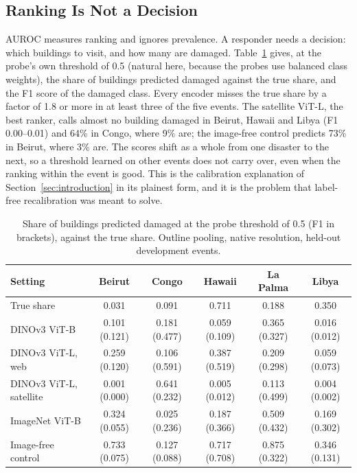 \documentclass[journal]{IEEEtran}
\begin{document}
\subsection{Ranking Is Not a Decision}
\label{sec:res-threshold}
AUROC measures ranking and ignores prevalence. A responder needs a decision: which buildings to visit, and how many are damaged. Table~\ref{tab:threshold} gives, at the probe's own threshold of 0.5 (natural here, because the probes use balanced class weights), the share of buildings predicted damaged against the true share, and the F1 score of the damaged class. Every encoder misses the true share by a factor of 1.8 or more in at least three of the five events. The satellite ViT-L, the best ranker, calls almost no building damaged in Beirut, Hawaii and Libya (F1 0.00--0.01) and 64\% in Congo, where 9\% are; the image-free control predicts 73\% in Beirut, where 3\% are. The scores shift as a whole from one disaster to the next, so a threshold learned on other events does not carry over, even when the ranking within the event is good. This is the calibration explanation of Section~\ref{sec:introduction} in its plainest form, and it is the problem that label-free recalibration was meant to solve.

\begin{table}[t]
\centering
\caption{Share of buildings predicted damaged at the probe threshold of 0.5 (F1 in brackets), against the true share. Outline pooling, native resolution, held-out development events.}
\label{tab:threshold}
\footnotesize
\begin{tabular}{@{}lccccc@{}}
\toprule
Setting & Beirut & Congo & Hawaii & La Palma & Libya \\
\midrule
True share & 0.031 & 0.091 & 0.711 & 0.188 & 0.350 \\
\midrule
DINOv3 ViT-B & 0.101 (0.121) & 0.181 (0.477) & 0.059 (0.109) & 0.365 (0.327) & 0.016 (0.012) \\
DINOv3 ViT-L, web & 0.259 (0.120) & 0.106 (0.591) & 0.387 (0.519) & 0.209 (0.298) & 0.059 (0.073) \\
DINOv3 ViT-L, satellite & 0.001 (0.000) & 0.641 (0.232) & 0.005 (0.012) & 0.113 (0.499) & 0.004 (0.002) \\
ImageNet ViT-B & 0.324 (0.055) & 0.025 (0.236) & 0.187 (0.366) & 0.509 (0.432) & 0.169 (0.302) \\
Image-free control & 0.733 (0.075) & 0.127 (0.088) & 0.717 (0.708) & 0.875 (0.322) & 0.346 (0.131) \\
\bottomrule
\end{tabular}
\end{table}
\end{document}
